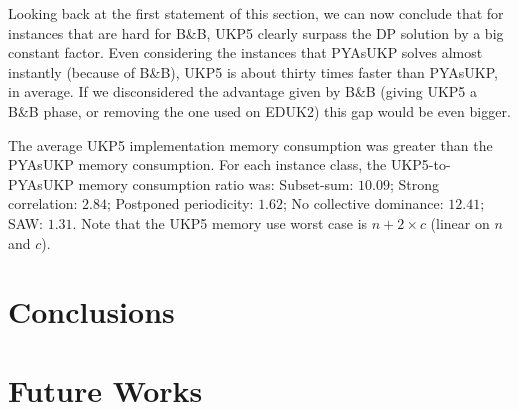 \documentclass[runningheads,a4paper]{llncs}
\begin{document}
Looking back at the first statement of this section, we can now conclude that for instances that are hard for B\&B, UKP5 clearly surpass the DP solution by a big constant factor. Even considering the instances that PYAsUKP solves almost instantly (because of B\&B), UKP5 is about thirty times faster than PYAsUKP, in average. If we disconsidered the advantage given by B\&B (giving UKP5 a B\&B phase, or removing the one used on EDUK2) this gap would be even bigger.

The average UKP5 implementation memory consumption was greater than the PYAsUKP memory consumption. For each instance class, the UKP5-to-PYAsUKP memory consumption ratio was: Subset-sum: \(10.09\); Strong correlation: \(2.84\); Postponed periodicity: \(1.62\); No collective dominance: \(12.41\); SAW: \(1.31\). Note that the UKP5 memory use worst case is \(n + 2\times c\) (linear on \(n\) and \(c\)).

\section{Conclusions}

\section{Future Works}
\end{document}
